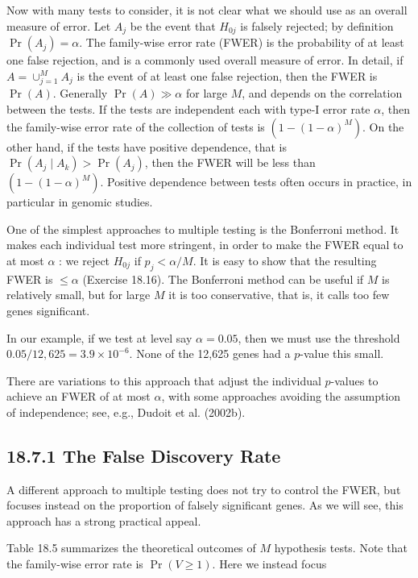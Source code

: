 \documentclass[10pt]{article}
\begin{document}
Now with many tests to consider, it is not clear what we should use as an overall measure of error. Let $A_{j}$ be the event that $H_{0 j}$ is falsely rejected; by definition $\operatorname{Pr}\left(A_{j}\right)=\alpha$. The family-wise error rate (FWER) is the probability of at least one false rejection, and is a commonly used overall measure of error. In detail, if $A=\cup_{j=1}^{M} A_{j}$ is the event of at least one false rejection, then the FWER is $\operatorname{Pr}(A)$. Generally $\operatorname{Pr}(A) \gg \alpha$ for large $M$, and depends on the correlation between the tests. If the tests are independent each with type-I error rate $\alpha$, then the family-wise error rate of the collection of tests is $\left(1-(1-\alpha)^{M}\right)$. On the other hand, if the tests have positive dependence, that is $\operatorname{Pr}\left(A_{j} \mid A_{k}\right)>\operatorname{Pr}\left(A_{j}\right)$, then the FWER will be less than $\left(1-(1-\alpha)^{M}\right)$. Positive dependence between tests often occurs in practice, in particular in genomic studies.

One of the simplest approaches to multiple testing is the Bonferroni method. It makes each individual test more stringent, in order to make the FWER equal to at most $\alpha$ : we reject $H_{0 j}$ if $p_{j}<\alpha / M$. It is easy to show that the resulting FWER is $\leq \alpha$ (Exercise 18.16). The Bonferroni method can be useful if $M$ is relatively small, but for large $M$ it is too conservative, that is, it calls too few genes significant.

In our example, if we test at level say $\alpha=0.05$, then we must use the threshold $0.05 / 12,625=3.9 \times 10^{-6}$. None of the 12,625 genes had a $p$-value this small.

There are variations to this approach that adjust the individual $p$-values to achieve an FWER of at most $\alpha$, with some approaches avoiding the assumption of independence; see, e.g., Dudoit et al. (2002b).

\subsection*{18.7.1 The False Discovery Rate}
A different approach to multiple testing does not try to control the FWER, but focuses instead on the proportion of falsely significant genes. As we will see, this approach has a strong practical appeal.

Table 18.5 summarizes the theoretical outcomes of $M$ hypothesis tests. Note that the family-wise error rate is $\operatorname{Pr}(V \geq 1)$. Here we instead focus
\end{document}
